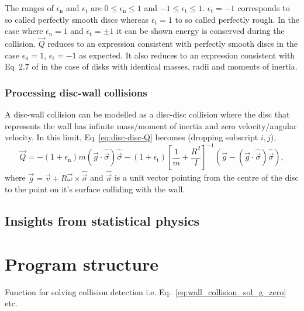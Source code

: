 \documentclass{article}
\begin{document}
The ranges of $\epsilon_\mathrm{n}$ and $\epsilon_\mathrm{t}$ are $0 \leq \epsilon_\mathrm{n} \leq 1$ and $-1 \leq \epsilon_\mathrm{t} \leq 1$. $\epsilon_\mathrm{t} = -1$ corresponds to so called perfectly smooth discs whereas $\epsilon_\mathrm{t} = 1$ to so called perfectly rough. In the case where $\epsilon_\mathrm{n} = 1$ and $\epsilon_\mathrm{t} = \pm 1$ it can be shown energy is conserved during the collision. $\vec{Q}$ reduces to an expression consistent with perfectly smooth discs in the case $\epsilon_\mathrm{n} = 1$, $\epsilon_\mathrm{t} = -1$ as expected. It also reduces to an expression consistent with Eq~2.7 of \cite{Kremer-2014} in the case of disks with identical masses, radii and moments of inertia.

\subsubsection{Processing disc-wall collisions}
A disc-wall collision can be modelled as a disc-disc collision where the disc that represents the wall has infinite mass/moment of inertia and zero velocity/angular velocity. In this limit, Eq~\ref{eq:disc-disc-Q} becomes (dropping subscript $i, j$),
\begin{equation}
    \vec{Q}
    =
    -(1 + \epsilon_\mathrm{n})
    m
    (\vec{g} \cdot \hat{\vec{\sigma}}) \hat{\vec{\sigma}}
    -
    (1+\epsilon_\mathrm{t})
    \left[
        \frac{1}{m}
        +
        \frac{R^2}{I}
    \right]^{-1}
    \left(
        \vec{g} - (\vec{g} \cdot \hat{\vec{\sigma}}) \hat{\vec{\sigma}}
    \right),
\end{equation}
where $\vec{g} = \vec{v} + R \vec{\omega} \times \hat{\vec{\sigma}}$ and $\hat{\vec{\sigma}}$ is a unit vector pointing from the centre of the disc to the point on it's surface colliding with the wall.

\subsection{Insights from statistical physics}

\section{Program structure}
Function for solving collision detection i.e. Eq.~\ref{eq:wall_collision_sol_g_zero} etc.
\end{document}
